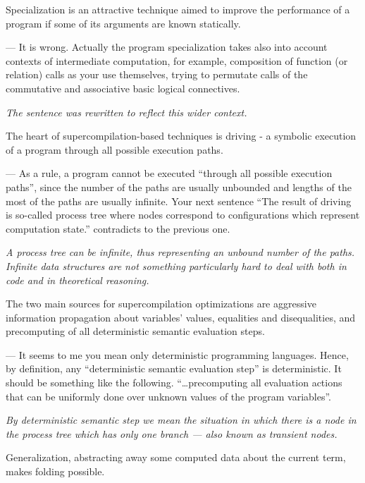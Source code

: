 \begin{enumerate}
  \setcounter{enumi}{6}
  \item {Specialization is an attractive technique aimed to improve the performance of a program if some of its arguments are known statically.

  --- It is wrong. Actually the program specialization takes also into account contexts of intermediate computation, for example, composition of function (or relation) calls as your use themselves, trying to permutate calls of the commutative and associative basic logical connectives.

  \emph{The sentence was rewritten to reflect this wider context.}
  }

  \item{
    The heart of supercompilation-based techniques is driving - a symbolic execution of a program through all possible execution paths.

    --- As a rule, a program cannot be executed ``through all possible execution paths'', since the number of the paths are usually unbounded and lengths of the most of the paths are usually infinite. Your next sentence ``The result of driving is so-called process tree where nodes correspond to configurations which represent computation state.'' contradicts to the previous one.

    \emph{A process tree can be infinite, thus representing an unbound number of the paths.
    Infinite data structures are not something particularly hard to deal with both in code and in theoretical reasoning.}

    \item {
      The two main sources for supercompilation optimizations are aggressive information propagation about variables' values, equalities and disequalities, and precomputing of all deterministic semantic evaluation steps.

      --- It seems to me you mean only deterministic programming languages. Hence, by definition, any ``deterministic semantic evaluation step'' is deterministic. It should be something like the following. ``\dots precomputing all evaluation actions that can be uniformly done over unknown values of the program variables''.

      \emph{By deterministic semantic step we mean the situation in which there is a node in the process tree which has only one branch --- also known as transient nodes.}
    }

    \item{
      Generalization, abstracting away some computed data about the current term, makes folding possible.

}}
\end{enumerate}
